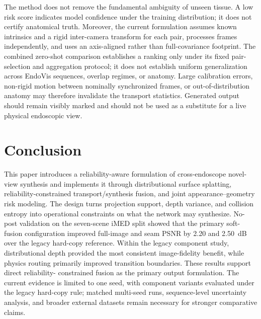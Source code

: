 \documentclass[letterpaper,10pt,conference]{ieeeconf}
\begin{document}
The method does not remove the fundamental ambiguity of unseen tissue. A low
risk score indicates model confidence under the training distribution; it does
not certify anatomical truth. Moreover, the current formulation assumes known
intrinsics and a rigid inter-camera transform for each pair, processes frames
independently, and uses an axis-aligned rather than full-covariance footprint.
The combined zero-shot comparison establishes a ranking only under its fixed
pair-selection and aggregation protocol; it does not establish uniform
generalization across EndoVis sequences, overlap regimes, or anatomy.
Large calibration errors, non-rigid motion between nominally synchronized
frames, or out-of-distribution anatomy may therefore invalidate the transport
statistics. Generated output should remain visibly marked and should not be
used as a substitute for a live physical endoscopic view.

\section{Conclusion}
\label{sec:conclusion}

This paper introduces a reliability-aware formulation of cross-endoscope
novel-view synthesis and implements it through distributional surface
splatting, reliability-constrained transport/synthesis fusion, and
joint appearance--geometry risk modeling. The design
turns projection support, depth variance, and collision entropy into operational
constraints on what the network may synthesize. No-post validation on the
seven-scene iMED split showed that the primary soft-fusion configuration
improved full-image and seam PSNR by 2.20 and 2.50~dB over the legacy hard-copy
reference. Within the legacy component study, distributional depth provided
the most consistent image-fidelity benefit, while physics routing primarily
improved transition boundaries. These results support direct reliability-
constrained fusion as the primary output formulation. The current evidence is
limited to one seed, with component variants evaluated under the legacy
hard-copy rule; matched multi-seed runs, sequence-level uncertainty analysis,
and broader external datasets remain necessary for stronger comparative
claims.



\end{document}
